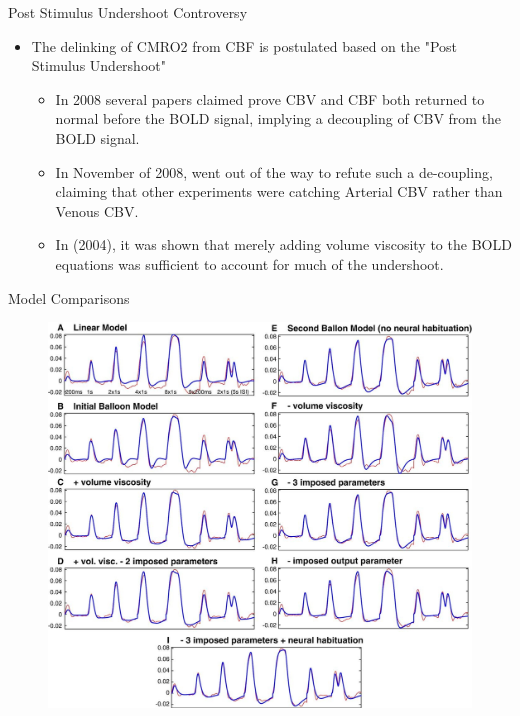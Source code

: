 \documentclass{beamer}
\begin{document}
\begin{frame}{Post Stimulus Undershoot Controversy}
\begin{itemize}
    \item The delinking of CMRO2 from CBF is postulated based on the "Post Stimulus Undershoot"
    \begin{itemize}
        \item In 2008 several papers claimed prove CBV and CBF both returned
            to normal before the BOLD signal, implying a decoupling of CBV from the BOLD signal.
        \item In November of 2008, \cite{ISI:000265938700001} went out of the way to refute such a de-coupling,
            claiming that other experiments were catching Arterial CBV rather than Venous CBV.
        \item In \cite{ISI:000240969200015} (2004), it was shown that merely adding volume viscosity to
            the BOLD equations was sufficient to account for much of the undershoot.
    \end{itemize}
\end{itemize}
\end{frame}

\begin{frame}{Model Comparisons}
\begin{figure}
\includegraphics[scale=.165]{demeux}
\end{figure}
\end{frame}
\end{document}
